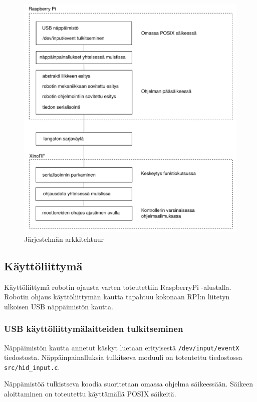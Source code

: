 \documentclass[]{article} %
\numberwithin{equation}{section}
\numberwithin{figure}{section}
\numberwithin{table}{section}
\begin{document}
\begin{figure}
    \centering
    \caption{Järjestelmän arkkitehtuur}
    \label{fig:architechture}
    \includegraphics[scale=0.5]{./architechture.pdf}
\end{figure}

\subsection{Käyttöliittymä}
\label{sec:Kayttoliittyma}

Käyttöliittymä robotin ojausta varten toteutettiin RaspberryPi -alustalla.
Robotin ohjaus käyttöliittymän kautta tapahtuu kokonaan RPI:n liitetyn ulkoisen USB näppäimistön kautta.

\subsubsection{USB käyttöliittymälaitteiden tulkitseminen}
\label{sub:USB kayttoliittymalaitteiden tulkitseminen}

Näppäimistön kautta annetut käskyt luetaan erityisestä \verb+/dev/input/eventX+ tiedostosta. Näppäinpainalluksia tulkitseva moduuli on toteutettu tiedostossa \verb+src/hid_input.c+.

Näppämistöä tulkistseva koodia suoritetaan omassa ohjelma säikeessään. Säikeen aloittaminen on toteutettu käyttämällä POSIX säikeitä.
\end{document}
